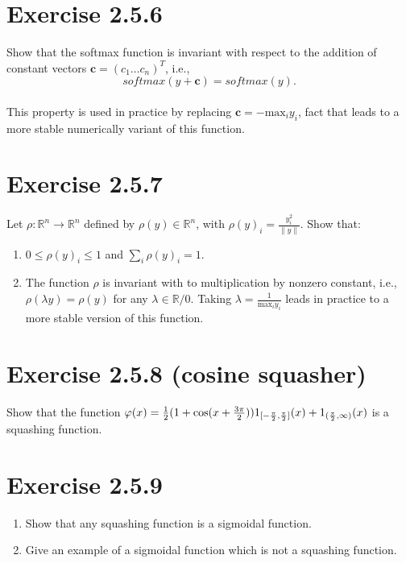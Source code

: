 \documentclass{exam}
\begin{document}
\section*{Exercise 2.5.6}
Show that the softmax function is invariant with respect to the addition of constant vectors $\pmb{c} = (c_1 \ldots c_n)^{T}$, i.e., \\
\begin{equation*}
    softmax(y + \pmb{c}) = softmax(y).
\end{equation*}\\
This property is used in practice by replacing $\pmb{c} = - \text{max}_i y_i$, fact that leads to a more stable numerically variant of this function.

\section*{Exercise 2.5.7}
Let $\rho: \mathbb{R}^n \rightarrow \mathbb{R}^n$ defined by $\rho(y) \in \mathbb{R}^n$, with $\rho(y)_i = \frac{y^2_i}{\lVert y \rVert }$. Show that: 
\begin{enumerate}
    \item $0 \leq \rho(y)_i \leq 1$ and $\sum_i \rho(y)_i = 1$.
    \item The function $\rho$ is invariant with to multiplication by nonzero constant, i.e., $\rho(\lambda y ) = \rho(y)$ for any $\lambda \in \mathbb{R}/{0}$. Taking $\lambda = \frac{1}{\text{max}_i y_i}$ leads in practice to a more stable version of this function. 
\end{enumerate}

\section*{Exercise 2.5.8 (cosine squasher)}
Show that the function $\varphi(x) = \frac{1}{2}(1 + \text{cos}(x + \frac{3\pi}{2}))1_{\tiny [-\frac{\pi}{2}, \frac{\pi}{2}]}(x) + 1_{\tiny (\frac{\pi}{2}, \infty)}(x)$ is a 
squashing function.

\section*{Exercise 2.5.9}
\begin{enumerate}
    \item Show that any squashing function is a sigmoidal function.
    \item Give an example of a sigmoidal function which is not a squashing function.
\end{enumerate}
\end{document}
